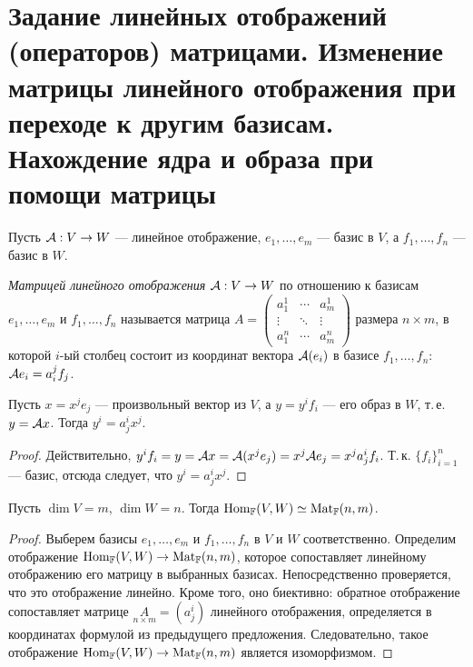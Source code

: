 \section{Задание линейных отображений (операторов) матрицами. Изменение матрицы линейного отображения при переходе к другим базисам. Нахождение ядра и образа при помощи матрицы}

Пусть $\mathcal{A}: V \to W$ --- линейное отображение, $e_1, \ldots, e_m$ --- базис в $V$, а $f_1, \ldots, f_n$ --- базис в $W$.

\begin{definition}
    \textit{Матрицей линейного отображения} $\mathcal{A}: V \to W$ по отношению к базисам $e_1, \ldots, e_m$ и $f_1, \ldots, f_n$ называется матрица
    $
    A = 
    \begin{pmatrix}
        a^1_1 & \cdots & a^1_m\\
        \vdots & \ddots & \vdots\\
        a^n_1 & \cdots & a^n_m
    \end{pmatrix}
    $
    размера $n \times m$, в которой $i$-ый столбец состоит из координат вектора $\mathcal{A}(e_i)$ в базисе $f_1, \ldots, f_n$: $\mathcal{A} e_i = a^j_if_j$.
\end{definition}

\begin{proposal}
    Пусть $x = x^je_j$ --- произвольный вектор из $V$, а $y = y^if_i$ --- его образ в $W$, т.\,е. $y = \mathcal{A} x$. Тогда $y^i = a^i_jx^j$.
\end{proposal}

\begin{proof}
    Действительно, $y^if_i = y = \mathcal{A} x = \mathcal{A}(x^je_j) = x^j\mathcal{A} e_j = x^ja^i_jf_i$. Т.\,к. $\{f_i\}_{i = 1}^n$ --- базис, отсюда следует, что $y^i = a^i_jx^j$.
\end{proof}

\begin{proposal}
    Пусть $\dim V = m$, $\dim W = n$. Тогда $\operatorname{Hom}_{\mathbb{F}}(V, W) \simeq \operatorname{Mat}_{\mathbb{F}}(n, m)$.
\end{proposal}

\begin{proof}
    Выберем базисы $e_1, \ldots, e_m$ и $f_1, \ldots, f_n$ в $V$ и $W$ соответственно. Определим отображение $\operatorname{Hom}_{\mathbb{F}}(V, W) \to \operatorname{Mat}_{\mathbb{F}}(n, m)$, которое сопоставляет линейному отображению его матрицу в выбранных базисах. Непосредственно проверяется, что это отображение линейно. Кроме того, оно биективно: обратное отображение сопоставляет матрице $\underset{n \times m}{A} = (a^i_j)$ линейного отображения, определяется в координатах формулой из предыдущего предложения. Следовательно, такое отображение $\operatorname{Hom}_{\mathbb{F}}(V, W) \to \operatorname{Mat}_{\mathbb{F}}(n, m)$ является изоморфизмом.
\end{proof}

